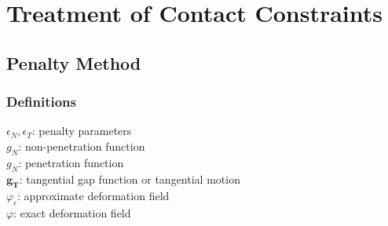 \documentclass[12pt,3p]{article}
\numberwithin{equation}{section}
\begin{document}
\section{Treatment of Contact Constraints}
\subsection{Penalty Method}
\subsubsection{Definitions}
$\epsilon_N, \epsilon_T$: penalty parameters \\
$g_N$: non-penetration function \\
$g_{\bar{N}}$: penetration function \\
$\mathbf{g_T}$: tangential gap function or tangential motion  \\
$\varphi_{\epsilon}$: approximate deformation field \\
$\varphi$: exact deformation field
\end{document}
